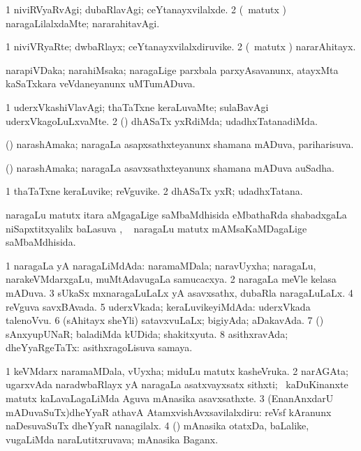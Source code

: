\bentry
{}
\gl{\kirxvi}
\bmng
\bnum
\num{1} niviRVyaRvAgi; dubaRlavAgi; ceYtanayxvilalxde. 
\num{2} (\aMrashA\ matutx \pArxvi) naragaLilalxdaMte; nararahitavAgi. 
\enum
\emng
\eentry

\bentry
{}
\gl{\nA}
\bmng
\bnum
\num{1} niviVRyaRte; dwbaRlayx; ceYtanayxvilalxdiruvike. 
\num{2} (\aMrashA\ matutx \pArxvi) nararAhitayx. 
\enum
\emng
\eentry

\bentry
{}
\gl{\gu}
\bmng
 narapiVDaka; narahiMsaka; naragaLige parxbala parxyAsavanunx, atayxMta kaSaTxkara veVdaneyanunx uMTumADuva. 
\emng
\eentry

\bentry
{}
\gl{\kirxvi}
\bmng
\bnum
\num{1} uderxVkashiVlavAgi; thaTaTxne keraLuvaMte; sulaBavAgi uderxVkagoLuLxvaMte. 
\num{2} (\ame) dhASaTx yxRdiMda; udadhxTatanadiMda. 
\enum
\emng
\eentry

\bentry
{}
\gl{\gu}
\bmng
(\veYshA) narashAmaka; naragaLa asapxsathxteyanunx shamana mADuva, pariharisuva. 
\emng
\eentry

\bentry
{}
\gl{\nA}
\bmng
(\veYshA) narashAmaka; naragaLa asavxsathxteyanunx shamana mADuva auSadha. 
\emng
\eentry

\bentry
{}
\gl{\nA}
\bmng
\bnum
\num{1} thaTaTxne keraLuvike; reVguvike. 
\num{2} dhASaTx yxR; udadhxTatana. 
\enum
\emng
\eentry

\bentry
{}
\gl{\sapUpa}
\bmng
naragaLu matutx itara aMgagaLige saMbaMdhisida eMbathaRda shabadxgaLa niSapxtitxyalilx baLasuva \pUpa, \udA\  naragaLu matutx mAMsaKaMDagaLige saMbaMdhisida. 
\emng
\eentry

\bentry
{}
\gl{\gu}
\bmng
\bnum
\num{1} naragaLa yA naragaLiMdAda:  naramaMDala; naravUyxha; naragaLu, narakeVMdarxgaLu, muMtAdavugaLa samucacxya. 
\num{2} naragaLa meVle kelasa mADuva. 
\num{3} sUkaSx mxnaragaLuLaLx yA asavxsathx, dubaRla naragaLuLaLx. 
\num{4} reVguva savxBAvada. 
\num{5} uderxVkada; keraLuvikeyiMdAda:  uderxVkada talenoVvu. 
\num{6} (sAhitayx sheYli) satavxvuLaLx; bigiyAda; aDakavAda. 
\num{7} (\pArxparx) sAnxyupUNaR; baladiMda kUDida; shakitxyuta. 
\num{8} asithxravAda; dheYyaRgeTaTx:  asithxragoLisuva samaya. 
\enum
\emng

\noindent
\gl{\pagu}
\bmng
\bnum
\num{1}  keVMdarx naramaMDala, vUyxha; miduLu matutx kasheVruka. 
\num{2}  narAGAta; ugarxvAda naradwbaRlayx yA naragaLa asatxvayxsatx sithxti; \sA\ kaDuKinanxte matutx kaLavaLagaLiMda Aguva mAnasika asavxsathxte. 
\num{3} (EnanAnxdarU mADuvaSuTx)dheYyaR athavA AtamxvishAvxsavilalxdiru:  reVsf kAranunx naDesuvaSuTx dheYyaR nanagilalx. 
\num{4} (\AmA) mAnasika otatxDa, baLalike, \mo vugaLiMda naraLutitxruvava; mAnasika Baganx. 
\enum
\emng
\eentry

